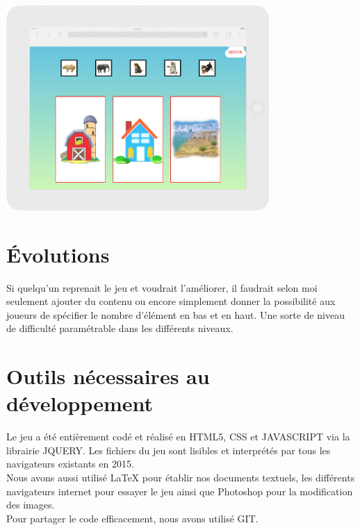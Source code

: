 \documentclass{article}
\begin{document}
\begin{center}
\includegraphics[width=0.75\textwidth]{zone7}
\end{center}
\vspace{0.5cm}

\newpage
\section{\'Evolutions}

Si quelqu'un reprenait le jeu et voudrait l'améliorer, il faudrait selon moi seulement ajouter du contenu ou encore simplement donner la possibilité aux joueurs de spécifier le nombre d'élément en bas et en haut. Une sorte de niveau de difficulté paramétrable dans les différents niveaux.

\newpage
\section{Outils nécessaires au développement}

\hspace*{0.6cm}Le jeu a été entièrement codé et réalisé en HTML5, CSS et JAVASCRIPT via la librairie JQUERY. Les fichiers du jeu sont lisibles et interprétés par tous les navigateurs existants en 2015.\\
\hspace*{0.6cm}Nous avons aussi utilisé LaTeX pour établir nos documents textuels, les différents navigateurs internet pour essayer le jeu ainsi que Photoshop pour la modification des images.\\
Pour partager le code efficacement, nous avons utilisé GIT.
\end{document}
